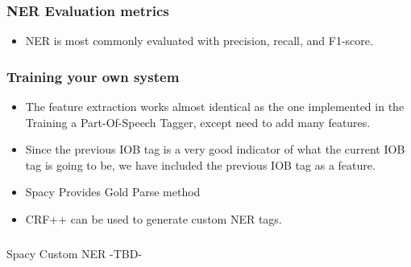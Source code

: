 \begin{frame}[fragile]\frametitle{NER Evaluation metrics}
  \begin{itemize}
  \item NER is most commonly evaluated with precision, recall, and F1-score.
  \end{itemize}
\end{frame}


\begin{frame}[fragile]\frametitle{Training your own system}
  \begin{itemize}
  \item The feature extraction works almost identical as the one implemented in the Training a Part-Of-Speech Tagger, except need to add many features.
  \item Since the previous IOB tag is a very good indicator of what the current IOB tag is going to be, we have included the previous IOB tag as a feature.
  \item Spacy Provides Gold Parse method
  \item CRF++ can be used to generate custom NER tags.
  \end{itemize}
\end{frame}

\begin{frame}[fragile]\frametitle{}

\begin{center}
{\Large Spacy Custom NER -TBD-}
\end{center}
\end{frame}


